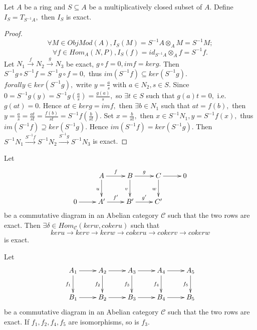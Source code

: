 \begin{prop}
Let $A$ be a ring and $S\subseteq A$ be a multiplicatively closed
subset of $A.$ Define $I_S=T_{S^{-1}A},$ then $I_S$ is exact.
\end{prop}
\begin{proof}
$$\forall M\in ObjMod(A), I_S(M)=S^{-1}A\otimes_A M=S^{-1}M;$$
$$\forall f\in Hom_A(N,P), I_S(f)=id_{S^{-1}A}\otimes_A f=S^{-1}f.$$
Let $N_1\stackrel{f}{\rightarrow}N_2\stackrel{g}{\rightarrow}N_3$ be
exact, $g\circ f=0, imf=kerg.$ Then $S^{-1}g\circ
S^{-1}f=S^{-1}g\circ f=0,$ thus $im(S^{-1}f)\subseteq ker(S^{-1}g).$
$forall y\in ker(S^{-1}g),$ write $y=\frac{a}{s}$ with $a\in N_2,
s\in S.$ Since $0=S^{-1}g(y)=S^{-1}g(\frac{a}{s})=\frac{g(a)}{s},$
so $\exists t\in S$ such that $g(a)t=0,$ i.e. $g(at)=0.$ Hence
$at\in kerg=imf,$ then $\exists b\in N_1$ such that $at=f(b),$ then
$y=\frac{a}{s}=\frac{at}{st}=\frac{f(b)}{st}=S^{-1}f(\frac{b}{st}).$
Set $x=\frac{b}{st},$ then $x\in S^{-1}N_1, y=S^{-1}f(x),$ thus
$im(S^{-1}f)\supseteq ker(S^{-1}g).$ Hence
$im(S^{-1}f)=ker(S^{-1}g).$ Then $S^{-1}N_1
\stackrel{S^{-1}f}{\rightarrow}S^{-1}
N_2\stackrel{S^{-1}g}{\rightarrow}S^{-1} N_3$ is exact.
\end{proof}
\begin{lemma}
Let
\[ \xymatrix{
   & A \ar[d]_u \ar[r]^f & B \ar[d]_v \ar[r]^g & C \ar[d]_w \ar[r]&
   0\\
   0 \ar[r] & A^{\prime} \ar[r]^{f^{\prime}} & B^{\prime}
   \ar[r]^{g^{\prime}} & C^{\prime} }  \]
be a commutative diagram in an Abelian category $\mathscr{C}$ such
that the two rows are exact. Then $\exists \delta\in
Hom_{\mathscr{C}}(kerw,cokeru)$ such that
$$keru\rightarrow kerv\rightarrow kerw\rightarrow cokeru\rightarrow cokerv\rightarrow cokerw$$
is exact.
\end{lemma}
\begin{lemma}
Let
\[ \xymatrix{
   A_1 \ar[d]_{f_1} \ar[r] & A_2 \ar[d]_{f_2} \ar[r] & A_3 \ar[d]_{f_3}
   \ar[r] & A_4 \ar[d]_{f_4} \ar[r] & A_5 \ar[d]_{f_5}         \\
   B_1 \ar[r] & B_2 \ar[r] & B_3 \ar[r] & B_4 \ar[r] & B_5 }  \]
be a commutative diagram in an Abelian category $\mathscr{C}$ such
that the two rows are exact. If $f_1,f_2,f_4,f_5$ are isomorphisms,
so is $f_3.$
\end{lemma}
